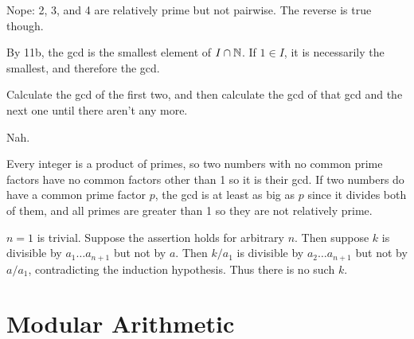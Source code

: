 \documentclass[11pt, oneside]{article}   	%
\begin{document}
\item \be
\item Nope: 2, 3, and 4 are relatively prime but not pairwise. The reverse is true though.
\item By 11b, the gcd is the smallest element of $I \cap \mathbb{N}$. If $1 \in I$, it is necessarily the smallest, and therefore the gcd.
\ee
\item \be \item Calculate the gcd of the first two, and then calculate the gcd of that gcd and the next one until there aren't any more. \item Nah. \ee
\item Every integer is a product of primes, so two numbers with no common prime factors have no common factors other than 1 so it is their gcd. If two numbers do have a common prime factor $p$, the gcd is at least as big as $p$ since it divides both of them, and all primes are greater than 1 so they are not relatively prime.
\item $n=1$ is trivial. Suppose the assertion holds for arbitrary $n$. Then suppose $k$ is divisible by $a_1\ldots a_{n+1}$ but not by $a$. Then $k/a_1$ is divisible by $a_2 \ldots a_{n+1}$ but not by $a/a_1$, contradicting the induction hypothesis. Thus there is no such $k$.
\ee

\section{Modular Arithmetic}
\end{document}
